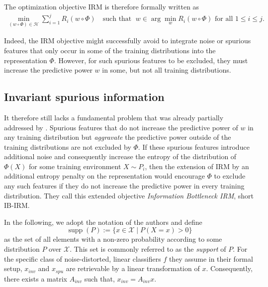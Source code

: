 The optimization objective IRM is therefore formally written as
\begin{align}
	\label{eq:irm-objective}
	\min_{(w\circ \Phi)\in\mathcal{H}}\sum_{i=1}^{j}R_i(w\circ \Phi) \quad \text{such that } \;w\in\arg\min_{w}R_i(w\circ \Phi) \text{ for all } 1\leq i \leq j.
\end{align}

Indeed, the IRM objective might successfully avoid to integrate noise or spurious features that only occur in some of the training distributions into the representation $\Phi$.
However, for such spurious features to be excluded, they must increase the predictive power $w$ in some, but not all training distributions.

\subsection{Invariant spurious information}
\label{sec:invariant-spurious-information}
It therefore still lacks a fundamental problem that was already partially addressed by \cite{kamath2021does,rosenfeld2020risks,ahuja2021invariance}.
Spurious features that do not increase the predictive power of $w$ in any training distribution but \textit{aggravate} the predictive power outside of the training distributions are not excluded by $\Phi$.
If these spurious features introduce additional noise and consequently increase the entropy of the distribution of $\Phi(X)$ for some training environment $X\sim P_i$, then the extension of IRM by an additional entropy penalty on the representation would encourage $\Phi$ to exclude any such features if they do not increase the predictive power in every training distribution.
They call this extended objective \textit{Information Bottleneck IRM}, short IB-IRM.

In the following, we adopt the notation of the authors and define
\begin{equation}
	\label{eq:support-distribution}
	\operatorname{supp}(P):=\{x\in\mathcal{X}\mid P(X=x)>0\}
\end{equation} 
as the set of all elements with a non-zero probability according to some distribution $P$ over $\mathcal{X}$.
This set is commonly referred to as the \textit{support} of $P$.
For the specific class of noise-distorted, linear classifiers $f$ they assume in their formal setup, $x_{inv}$ and $x_{spu}$ are retrievable by a linear transformation of $x$.
Consequently, there exists a matrix $A_{inv}$ such that, $x_{inv}=A_{inv} x$.

